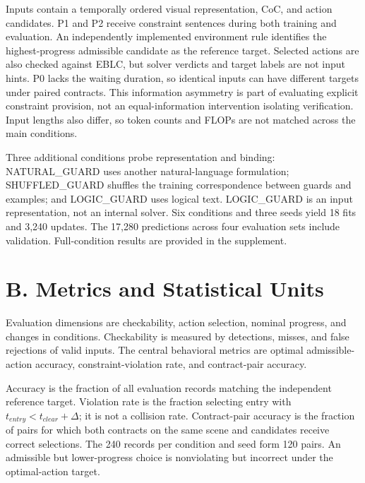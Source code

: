 \documentclass[11pt,a4paper]{article}
\begin{document}
Inputs contain a temporally ordered visual representation, CoC, and action candidates. P1 and P2 receive constraint sentences during both training and evaluation. An independently implemented environment rule identifies the highest-progress admissible candidate as the reference target. Selected actions are also checked against EBLC, but solver verdicts and target labels are not input hints. P0 lacks the waiting duration, so identical inputs can have different targets under paired contracts. This information asymmetry is part of evaluating explicit constraint provision, not an equal-information intervention isolating verification. Input lengths also differ, so token counts and FLOPs are not matched across the main conditions.\par

Three additional conditions probe representation and binding: NATURAL\_GUARD uses another natural-language formulation; SHUFFLED\_GUARD shuffles the training correspondence between guards and examples; and LOGIC\_GUARD uses logical text. LOGIC\_GUARD is an input representation, not an internal solver. Six conditions and three seeds yield 18 fits and 3,240 updates. The 17,280 predictions across four evaluation sets include validation. Full-condition results are provided in the supplement.\par

\section*{B. Metrics and Statistical Units}

Evaluation dimensions are checkability, action selection, nominal progress, and changes in conditions. Checkability is measured by detections, misses, and false rejections of valid inputs. The central behavioral metrics are optimal admissible-action accuracy, constraint-violation rate, and contract-pair accuracy.\par

Accuracy is the fraction of all evaluation records matching the independent reference target. Violation rate is the fraction selecting entry with \(t_{entry}<t_{clear}+\Delta\); it is not a collision rate. Contract-pair accuracy is the fraction of pairs for which both contracts on the same scene and candidates receive correct selections. The 240 records per condition and seed form 120 pairs. An admissible but lower-progress choice is nonviolating but incorrect under the optimal-action target.\par
\end{document}
